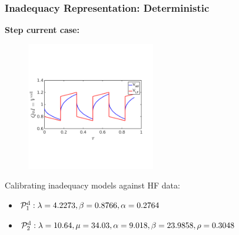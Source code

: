 \documentclass[10pt,xcolor=dvipsnames,compress]{beamer}
\begin{document}
\begin{frame}
\frametitle{Inadequacy Representation: Deterministic}
\textbf{Step current case:}

\vfill

\begin{figure}
\includegraphics[trim = 0.in  2.3in 0.in 2.8in.in, clip, width=0.5\textwidth]{figs/Istep_V_hf_lf.png}
\end{figure}

\vspace{-0.1in}

Calibrating inadequacy models against HF data: 

\begin{itemize}

\item $\mathcal{P}_1^{\rm d}:   \lambda = 4.2273, \beta = 0.8766, \alpha = 0.2764$

\item $\mathcal{P}_2^{\rm d}:   \lambda = 10.64, \mu = 34.03, \alpha = 9.018, \beta = 23.9858, \rho = 0.3048$

\end{itemize}

\vspace{-0.1in}


\end{frame}
\end{document}
